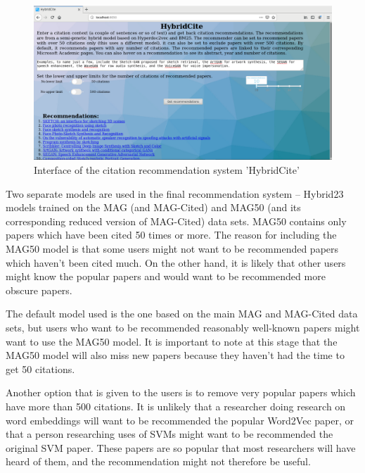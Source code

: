 \begin{figure}
    \centering
    \includegraphics[keepaspectratio, width=13cm]{figures/Approach/recommsystem.PNG}
    \caption{Interface of the citation recommendation system 'HybridCite'}
    \label{fig:hybridcite}
\end{figure}
Two separate models are used in the final recommendation system -- Hybrid23 models trained on the MAG (and MAG-Cited) and MAG50 (and its corresponding reduced version of MAG-Cited) data sets. MAG50 contains only papers which have been cited 50 times or more. The reason for including the MAG50 model is that some users might not want to be recommended papers which haven't been cited much. On the other hand, it is likely that other users might know the popular papers and would want to be recommended more obscure papers. 

The default model used is the one based on the main MAG and MAG-Cited data sets, but users who want to be recommended reasonably well-known papers might want to use the MAG50 model. It is important to note at this stage that the MAG50 model will also miss new papers because they haven't had the time to get 50 citations. 

Another option that is given to the users is to remove very popular papers which have more than 500 citations. It is unlikely that a researcher doing research on word embeddings will want to be recommended the popular Word2Vec paper, or that a person researching uses of SVMs might want to be recommended the original SVM paper. These papers are so popular that most researchers will have heard of them, and the recommendation might not therefore be useful.

